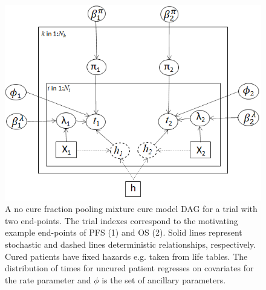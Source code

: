 \documentclass[AMA,STIX1COL]{WileyNJD-v2}
\begin{document}
\begin{figure}
\centering
\includegraphics[width=0.6\linewidth]{DAG_no_pooling.png}
\caption{\label{fig:dag_nopool} A no cure fraction pooling mixture cure model DAG for a trial with two end-points. The trial indexes correspond to the motivating example end-points of PFS (1) and OS (2).
Solid lines represent stochastic and dashed lines deterministic relationships, respectively.
Cured patients have fixed hazards e.g. taken from life tables.
The distribution of times for uncured patient regresses on covariates for the rate parameter and $\phi$ is the set of ancillary parameters.}
\end{figure}

\newpage






\end{document}
